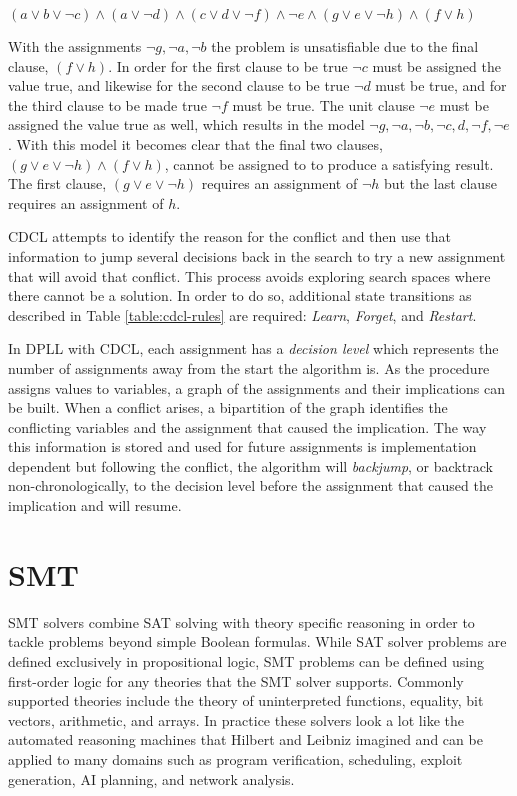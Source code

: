 \documentclass[]{final_report}
\begin{document}
$(a \lor b \lor \lnot c) \land (a \lor \lnot d) \land (c \lor d \lor \lnot{f}) \land \lnot{e} \land (g \lor e \lor \lnot h) \land (f \lor h)$

With the assignments $\lnot{g}, \lnot{a}, \lnot{b}$ the problem is unsatisfiable due to the final clause, $(f \lor h)$. In order for the first clause to be true $\lnot c$ must be assigned the value true, and likewise for the second clause to be true $\lnot d$ must be true, and for the third clause to be made true $\lnot{f}$ must be true. The unit clause $\lnot{e}$ must be assigned the value true as well, which results in the model $\lnot{g}, \lnot{a}, \lnot{b}, \lnot{c}, d, \lnot{f}, \lnot{e}$. With this model it becomes clear that the final two clauses, $(g \lor e \lor \lnot h) \land (f \lor h)$, cannot be assigned to to produce a satisfying result. The first clause, $(g \lor e \lor \lnot h)$ requires an assignment of $\lnot{h}$ but the last clause requires an assignment of $h$.

CDCL attempts to identify the reason for the conflict and then use that information to jump several decisions back in the search to try a new assignment that will avoid that conflict. This process avoids exploring search spaces where there cannot be a solution. In order to do so, additional state transitions as described in Table \ref{table:cdcl-rules} are required: \textit{Learn}, \textit{Forget}, and \textit{Restart}.

In DPLL with CDCL, each assignment has a \textit{decision level} which represents the number of assignments away from the start the algorithm is. As the procedure assigns values to variables, a graph of the assignments and their implications can be built. When a conflict arises, a bipartition of the graph identifies the conflicting variables and the assignment that caused the implication. The way this information is stored and used for future assignments is implementation dependent but following the conflict, the algorithm will \textit{backjump}, or backtrack non-chronologically, to the decision level before the assignment that caused the implication and will resume.

\section{SMT}

SMT solvers combine SAT solving with theory specific reasoning in order to tackle problems beyond simple Boolean formulas. While SAT solver problems are defined exclusively in propositional logic, SMT problems can be defined using first-order logic for any theories that the SMT solver supports. Commonly supported theories include the theory of uninterpreted functions, equality, bit vectors, arithmetic, and arrays. In practice these solvers look a lot like the automated reasoning machines that Hilbert and Leibniz imagined and can be applied to many domains such as program verification, scheduling, exploit generation, AI planning, and network analysis.
\end{document}
